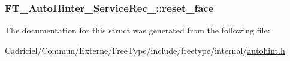 \hypertarget{struct_f_t___auto_hinter___service_rec___a846234a9c9c5427d3274e4568f33272c}{
\subsubsection[{reset\-\_\-face}]{ F\-T\-\_\-\-Auto\-Hinter\-\_\-\-Service\-Rec\-\_\-\-::reset\-\_\-face}}\label{struct_f_t___auto_hinter___service_rec___a846234a9c9c5427d3274e4568f33272c}


The documentation for this struct was generated from the following file\-:\begin{DoxyCompactItemize}
\item 
Cadriciel/\-Commun/\-Externe/\-Free\-Type/include/freetype/internal/\hyperlink{autohint_8h}{autohint.\-h}\end{DoxyCompactItemize}

